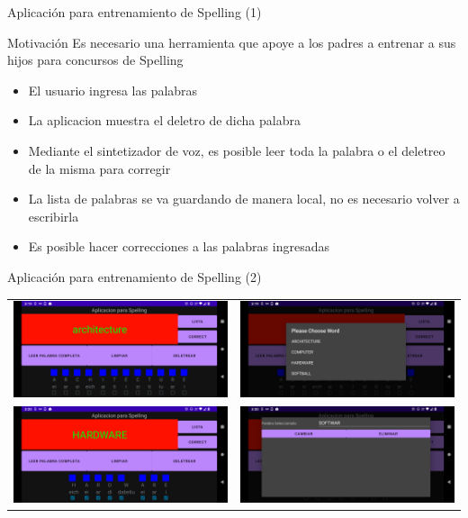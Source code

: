 
\begin{frame}{Aplicación para entrenamiento de Spelling (1)}
\begin{block}{Motivación} 
Es necesario una herramienta que apoye a los padres a entrenar a sus hijos para concursos de Spelling
\begin{itemize}
\item El usuario ingresa las palabras
\item La aplicacion muestra el deletro de dicha palabra
\item Mediante el sintetizador de voz, es posible leer toda la palabra o el deletreo de la misma para corregir
\item La lista de palabras se va guardando de manera local, no es necesario volver a escribirla
\item Es posible hacer correcciones a las palabras ingresadas
\end{itemize}
\end{block} 
\end{frame}


\begin{frame}{Aplicación para entrenamiento de Spelling (2)}
\begin{center}
	\begin{tabular}{cc}
		\includegraphics[width=0.46\linewidth]{2022_Spelling/figs/Spelling0.png} &
		\includegraphics[width=0.46\linewidth]{2022_Spelling/figs/Spelling1.png} \\ 		 		
		\includegraphics[width=0.46\linewidth]{2022_Spelling/figs/Spelling2.png} & 		
		\includegraphics[width=0.46\linewidth]{2022_Spelling/figs/Spelling3.png} \\
	\end{tabular}
\end{center}
\end{frame}

